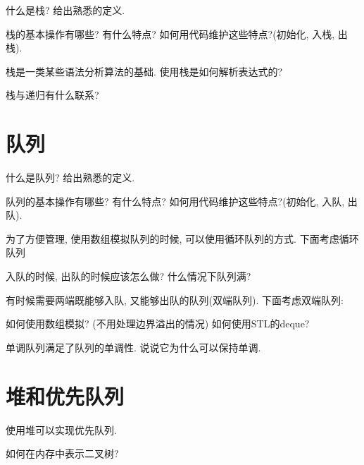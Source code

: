 \documentclass{ctexart}
\begin{document}
\begin{exc} 什么是栈? 给出熟悉的定义. 
\end{exc}

\begin{exc}
    栈的基本操作有哪些? 有什么特点? 如何用代码维护这些特点?(初始化, 入栈, 出栈).
\end{exc}

\begin{exc}
    栈是一类某些语法分析算法的基础. 使用栈是如何解析表达式的?
\end{exc}

\begin{exc}
    栈与递归有什么联系? 
\end{exc}

\section{队列} 

\begin{exc} 什么是队列? 给出熟悉的定义. 
\end{exc}

\begin{exc}
    队列的基本操作有哪些? 有什么特点? 如何用代码维护这些特点?(初始化, 入队, 出队).
\end{exc}

为了方便管理, 使用数组模拟队列的时候, 可以使用循环队列的方式. 下面考虑循环队列
\begin{exc}
    入队的时候, 出队的时候应该怎么做? 什么情况下队列满?
\end{exc}

有时候需要两端既能够入队, 又能够出队的队列(双端队列). 下面考虑双端队列:

\begin{exc}
   如何使用数组模拟? (不用处理边界溢出的情况) 如何使用STL的deque?  
\end{exc}

\begin{exc}
    单调队列满足了队列的单调性. 说说它为什么可以保持单调. 
\end{exc}

\section{堆和优先队列}

使用堆可以实现优先队列. 

\begin{exc}
如何在内存中表示二叉树?    
\end{exc}
\end{document}
